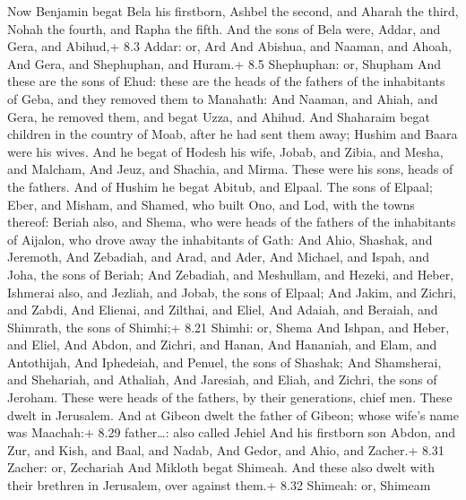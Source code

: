  Now Benjamin begat Bela his firstborn, Ashbel the second,
and Aharah the third,  Nohah the fourth, and Rapha the
fifth.  And the sons of Bela were, Addar, and Gera, and
Abihud,+ 8.3 Addar: or, Ard  And Abishua, and Naaman, and
Ahoah,  And Gera, and Shephuphan, and Huram.+ 8.5
Shephuphan: or, Shupham  And these are the sons of Ehud:
these are the heads of the fathers of the inhabitants of Geba, and they
removed them to Manahath:  And Naaman, and Ahiah, and Gera,
he removed them, and begat Uzza, and Ahihud.  And Shaharaim
begat children in the country of Moab, after he had sent them away;
Hushim and Baara were his wives.  And he begat of Hodesh his
wife, Jobab, and Zibia, and Mesha, and Malcham,  And Jeuz,
and Shachia, and Mirma. These were his sons, heads of the fathers.
 And of Hushim he begat Abitub, and Elpaal. 
The sons of Elpaal; Eber, and Misham, and Shamed, who built Ono, and
Lod, with the towns thereof:  Beriah also, and Shema, who
were heads of the fathers of the inhabitants of Aijalon, who drove away
the inhabitants of Gath:  And Ahio, Shashak, and Jeremoth,
 And Zebadiah, and Arad, and Ader,  And
Michael, and Ispah, and Joha, the sons of Beriah;  And
Zebadiah, and Meshullam, and Hezeki, and Heber,  Ishmerai
also, and Jezliah, and Jobab, the sons of Elpaal;  And
Jakim, and Zichri, and Zabdi,  And Elienai, and Zilthai,
and Eliel,  And Adaiah, and Beraiah, and Shimrath, the sons
of Shimhi;+ 8.21 Shimhi: or, Shema  And Ishpan, and Heber,
and Eliel,  And Abdon, and Zichri, and Hanan, 
And Hananiah, and Elam, and Antothijah,  And Iphedeiah, and
Penuel, the sons of Shashak;  And Shamsherai, and
Shehariah, and Athaliah,  And Jaresiah, and Eliah, and
Zichri, the sons of Jeroham.  These were heads of the
fathers, by their generations, chief men. These dwelt in Jerusalem.
 And at Gibeon dwelt the father of Gibeon; whose wife's
name was Maachah:+ 8.29 father\ldots: also called Jehiel 
And his firstborn son Abdon, and Zur, and Kish, and Baal, and Nadab,
 And Gedor, and Ahio, and Zacher.+ 8.31 Zacher: or,
Zechariah  And Mikloth begat Shimeah. And these also dwelt
with their brethren in Jerusalem, over against them.+ 8.32 Shimeah: or,
Shimeam

